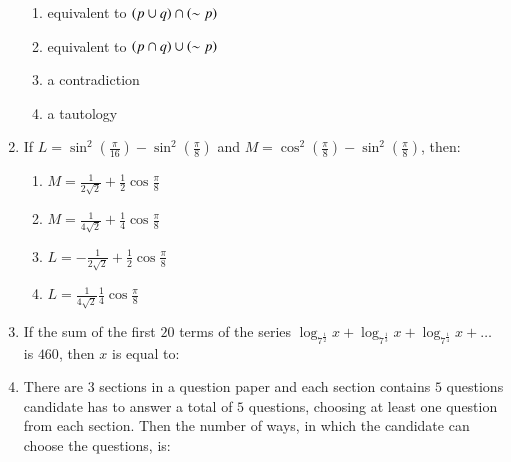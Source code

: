 \documentclass[journal,12pt,onecolumn]{IEEEtran}
\theoremstyle{remark}
\begin{document}
\begin{enumerate}
  \begin{enumerate}
 \item equivalent to $\left(p \cup q\right) \cap \left( \sim p\right)$       
 \item equivalent to $\left(p \cap q\right) \cup \left( \sim p\right)$      
 \item a contradiction
  \item a tautology
  \end{enumerate}
  \item If $L = \sin^2\left(\frac{\pi}{16}\right) - \sin^2\left(\frac{\pi}{8}\right)$
 and $M = \cos^2\left(\frac{\pi}{8}\right) - \sin^2\left(\frac{\pi}{8}\right)$, then:                 
 \begin{enumerate}                            
 \item $M = \frac{1}{2\sqrt{2}}+\frac{1}{2}\cos\frac{\pi}{8}$      
 \item $M = \frac{1}{4\sqrt{2}}+\frac{1}{4}\cos\frac{\pi}{8}$    
 \item $L = -\frac{1}{2\sqrt{2}}+\frac{1}{2}\cos\frac{\pi}{8}$    
 \item $L=\frac{1}{4\sqrt{2}}\frac{1}{4}\cos\frac{\pi}{8}$                             
 \end{enumerate}
 \item If the sum of the first $20$ terms of the series $\log_{{7}^{\frac{1}{2}}} x + \log_{{7}^{\frac{1}{3}}} x + \log_{{7}^{\frac{1}{4}}} x + \dots$ is $460$, then $x$ is equal to:
 \begin{enumerate}
 \end{enumerate} 
 \item There are $3$ sections in a question paper and each section contains $5$ questions candidate has to answer a total of $5$ questions, choosing at least one question from each section. Then the number of ways, in which the candidate can choose the questions, is:
 \begin{enumerate}
\end{enumerate}
\end{enumerate}
\end{document}
